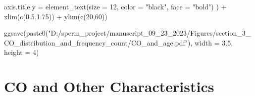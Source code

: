 \documentclass[
  letterpaper,
  DIV=11,
  numbers=noendperiod]{scrreprt}
\newenvironment{Shaded}{\begin{snugshade}}{\end{snugshade}}
\newcommand{\AttributeTok}[1]{\textcolor[rgb]{0.40,0.45,0.13}{#1}}
\newcommand{\DecValTok}[1]{\textcolor[rgb]{0.68,0.00,0.00}{#1}}
\newcommand{\FloatTok}[1]{\textcolor[rgb]{0.68,0.00,0.00}{#1}}
\newcommand{\FunctionTok}[1]{\textcolor[rgb]{0.28,0.35,0.67}{#1}}
\newcommand{\NormalTok}[1]{\textcolor[rgb]{0.00,0.23,0.31}{#1}}
\newcommand{\SpecialCharTok}[1]{\textcolor[rgb]{0.37,0.37,0.37}{#1}}
\newcommand{\StringTok}[1]{\textcolor[rgb]{0.13,0.47,0.30}{#1}}
\begin{document}
\begin{codelisting}
\begin{Shaded}
\begin{Highlighting}[]
        \AttributeTok{axis.title.y =} \FunctionTok{element\_text}\NormalTok{(}\AttributeTok{size =} \DecValTok{12}\NormalTok{, }\AttributeTok{color =} \StringTok{"black"}\NormalTok{, }\AttributeTok{face =} \StringTok{"bold"}\NormalTok{)}
\NormalTok{        ) }\SpecialCharTok{+} 
  \FunctionTok{xlim}\NormalTok{(}\FunctionTok{c}\NormalTok{(}\FloatTok{0.5}\NormalTok{,}\FloatTok{1.75}\NormalTok{)) }\SpecialCharTok{+} \FunctionTok{ylim}\NormalTok{(}\FunctionTok{c}\NormalTok{(}\DecValTok{20}\NormalTok{,}\DecValTok{60}\NormalTok{))}

\FunctionTok{ggsave}\NormalTok{(}\FunctionTok{paste0}\NormalTok{(}\StringTok{"D:/sperm\_project/manuscript\_09\_23\_2023/Figures/section\_3\_CO\_distribution\_and\_frequency\_count/CO\_and\_age.pdf"}\NormalTok{), }\AttributeTok{width =} \FloatTok{3.5}\NormalTok{, }\AttributeTok{height =} \DecValTok{4}\NormalTok{)  }
\end{Highlighting}
\end{Shaded}

\end{codelisting}

\hypertarget{co-and-other-characteristics}{%
\section{CO and Other
Characteristics}\label{co-and-other-characteristics}}
\end{document}
